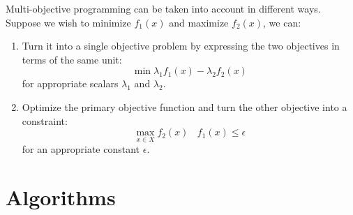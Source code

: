 \documentclass[12pt, a4paper]{report}
\newtheorem[style=M,bodystyle=\normalfont]{theorem}{Theorem}
\newtheorem[style=M,bodystyle=\normalfont]{corollary}{Corollary}
\newtheorem[style=M,bodystyle=\normalfont]{lemma}{Lemma}
\newtheorem[style=M,bodystyle=\normalfont]{definition}{Definition}
\begin{document}
    Multi-objective programming can be taken into account in different ways. Suppose we wish to minimize $f_1(x)$ and maximize $f_2(x)$, we can: 
    \begin{enumerate}
        \item Turn it into a single objective problem by expressing the two objectives in terms of the same unit: 
            \[\min{\lambda_1f_1(x)-\lambda_2f_2(x)}\]
            for appropriate scalars $\lambda_1$ and $\lambda_2$.
        \item Optimize the primary objective function and turn the other objective into a constraint: 
            \[\max_{x \in X}f_2(x) \:\:\:\: f_1(x)\leq \epsilon\]
            for an appropriate constant $\epsilon$. 
    \end{enumerate}

\newpage

\chapter{Algorithms}
\end{document}
